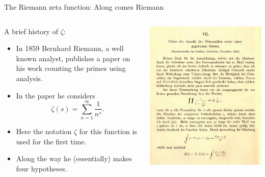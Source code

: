 \documentclass{beamer}
\begin{document}
\begin{frame}{The Riemann zeta function: Along comes Riemann}
\begin{columns}
\begin{column}{.575\textwidth}
A brief history of $\zeta$:
\begin{itemize}
\item In 1859 Bernhard Riemann, a well known analyst, publishes a paper on his work counting the primes using analysis.
\item<2-> In the paper he considers
\[
\zeta(s) = \sum_{n=1}^{\infty} \frac{1}{n^s}.
\]
\item<3-> Here the notation $\zeta$ for this function is used for the first time.
\item<4-> Along the way he (essentially) makes four hypotheses.
\end{itemize}
\end{column}
\begin{column}{.425\textwidth}
\includegraphics[width=\textwidth]{img/ueber}
\end{column}
\end{columns}
\end{frame}
\end{document}

